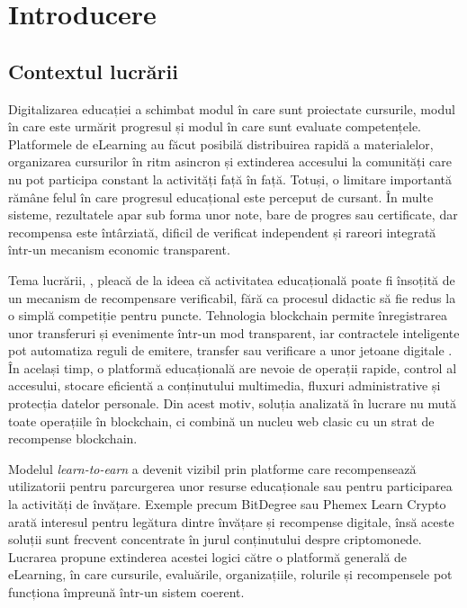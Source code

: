 \chapter{Introducere}

\section{Contextul lucrării}
Digitalizarea educației a schimbat modul în care sunt proiectate cursurile, modul în care este urmărit progresul și modul în care sunt evaluate competențele. Platformele de eLearning au făcut posibilă distribuirea rapidă a materialelor, organizarea cursurilor în ritm asincron și extinderea accesului la comunități care nu pot participa constant la activități față în față. Totuși, o limitare importantă rămâne felul în care progresul educațional este perceput de cursant. În multe sisteme, rezultatele apar sub forma unor note, bare de progres sau certificate, dar recompensa este întârziată, dificil de verificat independent și rareori integrată într-un mecanism economic transparent.

Tema lucrării, \textit{\titluLucrare}, pleacă de la ideea că activitatea educațională poate fi însoțită de un mecanism de recompensare verificabil, fără ca procesul didactic să fie redus la o simplă competiție pentru puncte. Tehnologia blockchain permite înregistrarea unor transferuri și evenimente într-un mod transparent, iar contractele inteligente pot automatiza reguli de emitere, transfer sau verificare a unor jetoane digitale \cite{ethereumWhitepaper,solidityDocs}. În același timp, o platformă educațională are nevoie de operații rapide, control al accesului, stocare eficientă a conținutului multimedia, fluxuri administrative și protecția datelor personale. Din acest motiv, soluția analizată în lucrare nu mută toate operațiile în blockchain, ci combină un nucleu web clasic cu un strat de recompense blockchain.

Modelul \textit{learn-to-earn} a devenit vizibil prin platforme care recompensează utilizatorii pentru parcurgerea unor resurse educaționale sau pentru participarea la activități de învățare. Exemple precum BitDegree \cite{bitdegree} sau Phemex Learn Crypto \cite{phemex} arată interesul pentru legătura dintre învățare și recompense digitale, însă aceste soluții sunt frecvent concentrate în jurul conținutului despre criptomonede. Lucrarea propune extinderea acestei logici către o platformă generală de eLearning, în care cursurile, evaluările, organizațiile, rolurile și recompensele pot funcționa împreună într-un sistem coerent.

